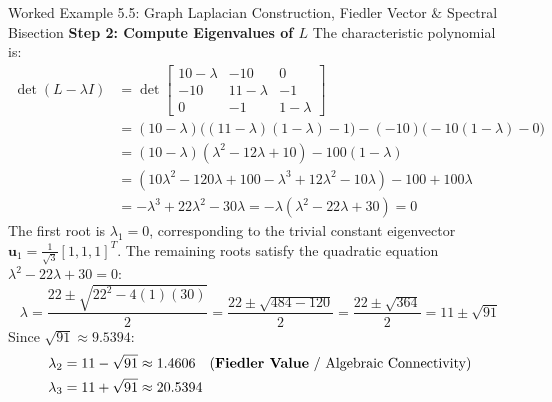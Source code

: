 \begin{examplebox}{Worked Example 5.5: Graph Laplacian Construction, Fiedler Vector \& Spectral Bisection}
\textbf{Step 2: Compute Eigenvalues of $L$}
The characteristic polynomial is:
\begin{align*}
\det(L - \lambda I) &= \det\begin{bmatrix} 10 - \lambda & -10 & 0 \\ -10 & 11 - \lambda & -1 \\ 0 & -1 & 1 - \lambda \end{bmatrix} \\
&= (10 - \lambda)\big( (11 - \lambda)(1 - \lambda) - 1 \big) - (-10)\big( -10(1 - \lambda) - 0 \big) \\
&= (10 - \lambda)(\lambda^2 - 12\lambda + 10) - 100(1 - \lambda) \\
&= (10\lambda^2 - 120\lambda + 100 - \lambda^3 + 12\lambda^2 - 10\lambda) - 100 + 100\lambda \\
&= -\lambda^3 + 22\lambda^2 - 30\lambda = -\lambda(\lambda^2 - 22\lambda + 30) = 0
\end{align*}
The first root is $\lambda_1 = 0$, corresponding to the trivial constant eigenvector $\mathbf{u}_1 = \frac{1}{\sqrt{3}}[1, 1, 1]^T$.
The remaining roots satisfy the quadratic equation $\lambda^2 - 22\lambda + 30 = 0$:
\begin{equation*}
\lambda = \frac{22 \pm \sqrt{22^2 - 4(1)(30)}}{2} = \frac{22 \pm \sqrt{484 - 120}}{2} = \frac{22 \pm \sqrt{364}}{2} = 11 \pm \sqrt{91}
\end{equation*}
Since $\sqrt{91} \approx 9.5394$:
\begin{align*}
\lambda_2 &= 11 - \sqrt{91} \approx 1.4606 \quad (\text{\textbf{Fiedler Value} / Algebraic Connectivity}) \\
\lambda_3 &= 11 + \sqrt{91} \approx 20.5394
\end{align*}


\end{examplebox}
